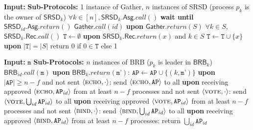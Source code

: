 \begin{algorithm}
    \label{alg:WCC}
    \caption{Implementation of \textsf{WCC} for process $p_{id}$ adapted from
    \cite{Freitas2022Distributed}}
    \begin{algorithmic}
        \State \textbf{Input:}
        \State \textbf{Sub-Protocols:} 1 instance of \textsf{Gather}, $n$ instances of
        \textsf{SRSD} (process $p_k$ is the owner of $\textsf{SRSD}_k$)
        \medskip
        \State $\forall k \in [n], \textsf{SRSD}_{k}.\textsf{Asg}.call()$
        \State \textbf{wait until} $\textsf{SRSD}_{id}.\textsf{Asg}.return()$
        \State \quad $\textsf{Gather}.call(id)$
        \State \textbf{upon} $\textsf{Gather}.return(S)$
        \State \quad $\forall k \in S$, $\textsf{SRSD}_k.\textsf{Rec}.call()$
        \State \quad $\texttt{T} \gets \emptyset$
        \State \textbf{upon} $\textsf{SRSD}_k.\textsf{Rec}.return(x)$ and $k \in S$
        \State \quad $\texttt{T} \gets \texttt{T} \cup \{x\}$
        \State \textbf{upon} $|\texttt{T}| = |S|$
        \State \quad return 0 if $0 \in \texttt{T}$ else 1
    \end{algorithmic}
\end{algorithm}

\begin{algorithm}
    \label{alg:Gather}
    \caption{Implementation of \textsf{Gather} from \cite{Attiya2025Beyond}}
    \begin{algorithmic}
        \State \textbf{Input:} $\texttt{m}$
        \State \textbf{Sub-Protocols:} $n$ instances of \textsf{BRB}
        ($p_k$ is leader in $\textsf{BRB}_k$)
        \medskip
        \State $\textsf{BRB}_{id}.call(\texttt{m})$
        \State \textbf{upon} $\textsf{BRB}_k.return(\texttt{m'})$:
        \State \quad $\texttt{AP} \gets \texttt{AP} \cup \{(k, \texttt{m'})\}$
        \State \textbf{upon} $|\texttt{AP}| \ge n-f$ and not sent
        $\langle \textsc{echo}, \cdot\rangle$:
        \State \quad send $\langle \textsc{echo}, \texttt{AP}\rangle$ to all
        \State \textbf{upon} receiving approved $\langle \textsc{echo}, \texttt{AP}_{id} \rangle$
        from at least $n - f$ processes and not sent $\langle \textsc{vote}, \cdot\rangle$:
        \State \quad send $\langle \textsc{vote}, \bigcup_{id} \texttt{AP}_{id} \rangle$ to all
        \State \textbf{upon} receiving approved $\langle \textsc{vote}, \texttt{AP}_{id} \rangle$
        from at least $n - f$ processes and not sent $\langle \textsc{bind}, \cdot\rangle$:
        \State \quad send $\langle \textsc{bind}, \bigcup_{id} \texttt{AP}_{id} \rangle$ to all
        \State \textbf{upon} receiving approved $\langle \textsc{bind}, \texttt{AP}_{id} \rangle$
        from at least $n - f$ processes:
        \State \quad return $\bigcup_{id} \texttt{AP}_{id}$
    \end{algorithmic}
\end{algorithm}

